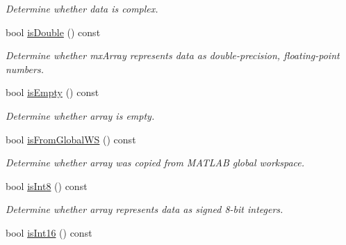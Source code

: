 \begin{DoxyCompactItemize}
\begin{DoxyCompactList}\small\item\em \-Determine whether data is complex. \end{DoxyCompactList}\item 
\hypertarget{class_mx_array_a116f603a7a7d50ab8bf3be571b07469c}{bool \hyperlink{class_mx_array_a116f603a7a7d50ab8bf3be571b07469c}{is\-Double} () const }\label{class_mx_array_a116f603a7a7d50ab8bf3be571b07469c}

\begin{DoxyCompactList}\small\item\em \-Determine whether mx\-Array represents data as double-\/precision, floating-\/point numbers. \end{DoxyCompactList}\item 
\hypertarget{class_mx_array_a3757ff128300eabba4abec14c942cbab}{bool \hyperlink{class_mx_array_a3757ff128300eabba4abec14c942cbab}{is\-Empty} () const }\label{class_mx_array_a3757ff128300eabba4abec14c942cbab}

\begin{DoxyCompactList}\small\item\em \-Determine whether array is empty. \end{DoxyCompactList}\item 
\hypertarget{class_mx_array_aa9e308686650119d3a61e564abd619f9}{bool \hyperlink{class_mx_array_aa9e308686650119d3a61e564abd619f9}{is\-From\-Global\-W\-S} () const }\label{class_mx_array_aa9e308686650119d3a61e564abd619f9}

\begin{DoxyCompactList}\small\item\em \-Determine whether array was copied from \-M\-A\-T\-L\-A\-B global workspace. \end{DoxyCompactList}\item 
\hypertarget{class_mx_array_a304b958ecd9b767425dc6f8b9e42c674}{bool \hyperlink{class_mx_array_a304b958ecd9b767425dc6f8b9e42c674}{is\-Int8} () const }\label{class_mx_array_a304b958ecd9b767425dc6f8b9e42c674}

\begin{DoxyCompactList}\small\item\em \-Determine whether array represents data as signed 8-\/bit integers. \end{DoxyCompactList}\item 
\hypertarget{class_mx_array_a849b4d39b68aa6bf84bf715cbac1cb84}{bool \hyperlink{class_mx_array_a849b4d39b68aa6bf84bf715cbac1cb84}{is\-Int16} () const }\label{class_mx_array_a849b4d39b68aa6bf84bf715cbac1cb84}


\end{DoxyCompactItemize}
